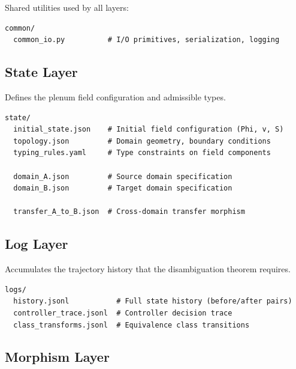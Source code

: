 \documentclass[11pt, oneside]{article}
\begin{document}
Shared utilities used by all layers:
\begin{verbatim}
common/
  common_io.py          # I/O primitives, serialization, logging
\end{verbatim}

\subsection{State Layer}

Defines the plenum field configuration and admissible types.
\begin{verbatim}
state/
  initial_state.json    # Initial field configuration (Phi, v, S)
  topology.json         # Domain geometry, boundary conditions
  typing_rules.yaml     # Type constraints on field components

  domain_A.json         # Source domain specification
  domain_B.json         # Target domain specification

  transfer_A_to_B.json  # Cross-domain transfer morphism
\end{verbatim}

\subsection{Log Layer}

Accumulates the trajectory history that the disambiguation theorem requires.
\begin{verbatim}
logs/
  history.jsonl           # Full state history (before/after pairs)
  controller_trace.jsonl  # Controller decision trace
  class_transforms.jsonl  # Equivalence class transitions
\end{verbatim}

\subsection{Morphism Layer}
\end{document}
